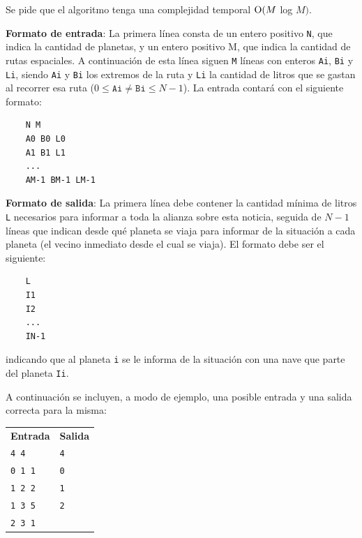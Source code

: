     Se pide que el algoritmo tenga una complejidad temporal $\operatorname{O}(M$ log $M)$.

    \vspace{1.25em}

    \textbf{Formato de entrada}: La primera línea consta de un entero positivo \texttt{N}, que indica la cantidad de planetas, y un entero positivo M, que indica la cantidad de rutas espaciales. A continuación de esta línea siguen \texttt{M} líneas con enteros \texttt{Ai}, \texttt{Bi} y \texttt{Li}, siendo \texttt{Ai} y \texttt{Bi} los extremos de la ruta y \texttt{Li} la cantidad de litros que se gastan al recorrer esa ruta ($0 \leq \mathtt{Ai} \neq \mathtt{Bi} \leq N-1$). La entrada contará con el siguiente formato:

    \begin{verbatim}
    N M
    A0 B0 L0 
    A1 B1 L1 
    ...
    AM-1 BM-1 LM-1\end{verbatim}

    \vspace{.8em}

    \textbf{Formato de salida}: La primera línea debe contener la cantidad mínima de litros \texttt{L} necesarios para informar a toda la alianza sobre esta noticia, seguida de $N-1$ líneas que indican desde qué planeta se viaja para informar de la situación a cada planeta (el vecino inmediato desde el cual se viaja). El formato debe ser el siguiente:
    
    \begin{verbatim}
    L
    I1
    I2
    ...
    IN-1\end{verbatim}

    indicando que al planeta \texttt{i} se le informa de la situación con una nave que parte del planeta \texttt{Ii}.

    \vspace{.8em}

    A continuación se incluyen, a modo de ejemplo, una posible entrada y una
    salida correcta para la misma:

    \vspace{.5em}
    \begin{tabular}{l @{\hskip 4em} l}
    \textbf{Entrada} & \textbf{Salida} \\
    \texttt{4 4}     & \texttt{4}      \\
    \texttt{0 1 1}   & \texttt{0}      \\
    \texttt{1 2 2}   & \texttt{1}      \\
    \texttt{1 3 5}   & \texttt{2}      \\
    \texttt{2 3 1}   &                 \\
    \end{tabular}
    \vspace{.5em}

